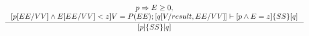$$
\inference{
  p \Rightarrow E \ge 0, \\
  [p[EE/VV] \land E[EE/VV] < z] V=P(EE); [q[V/result, EE/VV]] \vdash [p \land E=z] \lbrace SS\rbrace  [q]
}
{[p]\lbrace SS\rbrace [q]}
$$
